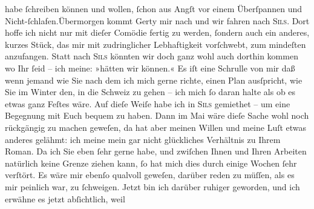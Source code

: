 \begin{ledgroupsized}[t]{13cm}
               habe ſchreiben können und wollen, ſchon aus Angſt vor einem Überſpannen und
                  Nicht-ſchlafen.\hspace*{1.5em}Übermorgen kommt Gerty mir nach und {\pb}wir fahren nach \textsc{Sils}. Dort hoffe ich nicht nur mit dieſer Comödie fertig zu werden, ſondern auch ein anderes, kurzes
                  Stück, das mir
               mit zudringlicher Lebhaftigkeit vorſchwebt, zum mindeſten anzufangen. \hspace*{1.5em}Statt nach \textsc{Sils} könnten wir doch ganz wohl auch dorthin kommen wo {\pb}Ihr ſeid – ich meine: »hätten wir
               können.« Es iſt eine Schrulle von mir daß wenn jemand wie Sie nach dem ich mich gerne
               richte, einen Plan ausſpricht, wie Sie im Winter den, in die Schweiz zu gehen – ich mich ſo daran halte als ob es etwas ganz
               Feſtes wäre. Auf dieſe Weiſe habe ich in \textsc{Sils} gemiethet – um eine Begegnung mit Euch {\pb}bequem zu haben. Dann im
                  Mai wäre dieſe Sache wohl noch rückgängig zu machen geweſen, da hat
               aber meinen Willen und meine Luſt etwas anderes gelähmt: ich meine mein gar nicht
               glückliches Verhältnis zu Ihrem Roman. Da ich Sie eben ſehr gerne habe, und zwiſchen Ihnen und Ihren
               Arbeiten natürlich keine Grenze ziehen kann, ſo hat mich dies {\pb}durch einige Wochen ſehr verſtört.
               Es wäre mir ebenſo qualvoll geweſen, darüber reden zu müſſen, als es mir peinlich
               war,  zu ſchweigen.\pend
           \pstart
           Jetzt bin ich darüber ruhiger geworden, und ich erwähne es jetzt abſichtlich, weil

\end{ledgroupsized}
